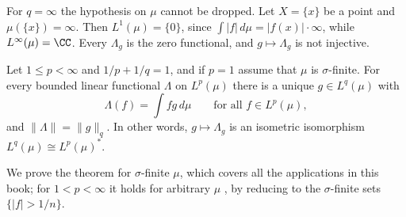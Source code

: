 \begin{counterexample}\label{signed-measures:counterexample-not-sigma-finite}
For $q = \infty$ the hypothesis on $\mu$ cannot be dropped. Let $X = \{x\}$ be a point and $\mu(\{x\}) = \infty$. Then $L^1(\mu) = \{0\}$, since $\int|f|\,d\mu = |f(x)|\cdot\infty$, while
$L^\infty(\mu) = \CC$. Every $\Lambda_g$ is the zero functional, and $g \mapsto \Lambda_g$ is not injective.
\end{counterexample}

\begin{theorem}\label{signed-measures:theorem-lp-duality}
Let $1 \leq p < \infty$ and $1/p + 1/q = 1$, and if $p = 1$ assume that $\mu$ is $\sigma$-finite. For every bounded linear functional $\Lambda$ on $L^p(\mu)$ there is a unique $g \in L^q(\mu)$ with
\[
\Lambda(f) = \int fg\,d\mu \qquad \text{for all } f \in L^p(\mu),
\]
and $\|\Lambda\| = \|g\|_q$. In other words, $g \mapsto \Lambda_g$ is an isometric isomorphism $L^q(\mu) \cong L^p(\mu)^*$.
\end{theorem}

We prove the theorem for $\sigma$-finite $\mu$, which covers all the applications in this book; for $1 < p < \infty$ it holds for arbitrary $\mu$ \cite[Theorem 6.15]{folland-real}, by reducing to the
$\sigma$-finite sets $\{|f| > 1/n\}$.

